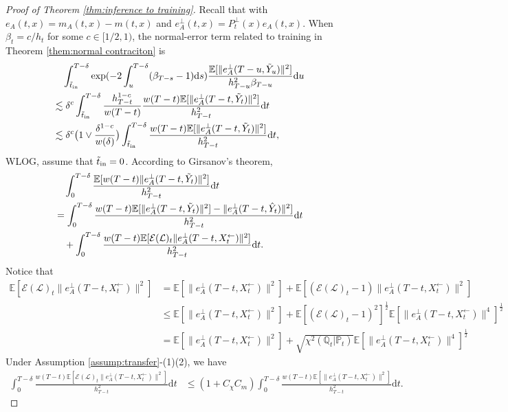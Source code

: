 \documentclass[11pt]{article}
\newcommand{\mb}{\mathbb}
\newcommand{\dee}{\mathrm{d}}
\newcommand{\mc}{\mathcal}
\begin{document}
\begin{proof}[Proof of Theorem \ref{thm:inference to training}]
\noindent Recall that with $e_A(t,x)=m_A(t,x)-m(t,x)$ and $e_A^\perp(t,x)=P^\perp_t(x) e_A(t,x)$. When $\beta_t=c/h_t$ for some $c\in [1/2,1)$, the normal-error term related to training in Theorem \ref{them:normal contraciton} is
\begin{align*}
&\quad\int_{\Tilde{t}_{\mathrm{in}}}^{T-\delta} \exp(-2\int_u^{T-\delta} (\beta_{T-s}-1)\dee s ) \frac{\mb{E}[\| e_A^\perp(T-u,\Tilde{Y}_u)\|^2]}{h_{T-u}^2\beta_{T-u}} \dee u \\
&\lesssim \delta^c \int_{\Tilde{t}_{\mathrm{in}}}^{T-\delta} \frac{h_{T-t}^{1-c}}{w(T-t)} \frac{w(T-t)\mb{E}[\| e_A^\perp(T-t,\Tilde{Y}_t)\|^2]}{h_{T-t}^2} \dee t\\
&\lesssim \delta^c  \big(1 \vee \frac{\delta^{1-c}}{w(\delta)}\big) \int_{\Tilde{t}_{\mathrm{in}}}^{T-\delta} \frac{w(T-t)\mb{E}[\| e_A^\perp(T-t,\Tilde{Y}_t)\|^2]}{h_{T-t}^2} \dee t,
\end{align*}
WLOG, assume that $\Tilde{t}_{\mathrm{in}}=0$. According to Girsanov's theorem,
\begin{align*}
    &\quad \int_0^{T-\delta} \frac{\mb{E}[w(T-t)\| e_A^\perp(T-t,\Tilde{Y}_t)\|^2]}{h_{T-t}^2} \dee t \\
    & = \int_0^{T-\delta} \frac{w(T-t)\mb{E}[\| e_A^\perp(T-t,\Tilde{Y}_t)\|^2]-\| e_A^\perp(T-t,\hat{Y}_t)\|^2] }{h_{T-t}^2} \dee t  \\
    &\quad + \int_0^{T-\delta} \frac{w(T-t)\mb{E}[\mc{E}(\mc{L})_t\| e_A^\perp(T-t,X_t^\leftarrow)\|^2]}{h_{T-t}^2}\dee t .
\end{align*}
Notice that
\begin{align*}
    \mb{E}[\mc{E}(\mc{L})_t\| e_A^\perp(T-t,X_t^\leftarrow)\|^2] & = \mb{E}[\| e_A^\perp(T-t,X_t^\leftarrow)\|^2] + \mb{E}[(\mc{E}(\mc{L})_t-1)\| e_A^\perp(T-t,X_t^\leftarrow)\|^2] \\
    & \le \mb{E}[\| e_A^\perp(T-t,X_t^\leftarrow)\|^2] + \mb{E}[(\mc{E}(\mc{L})_t-1)^2]^{\frac{1}{2}}  \mb{E}[\| e_A^\perp(T-t,X_t^\leftarrow)\|^4]^{\frac{1}{2}} \\
    & = \mb{E}[\| e_A^\perp(T-t,X_t^\leftarrow)\|^2] + \sqrt{\chi^2(\mb{Q}_t|\mb{P}_t)}  \mb{E}[\| e_A^\perp(T-t,X_t^\leftarrow)\|^4]^{\frac{1}{2}}
\end{align*}
Under Assumption \ref{assump:transfer}-(1)(2), we have
\begin{align*}
    \int_0^{T-\delta} \frac{w(T-t)\mb{E}[\mc{E}(\mc{L})_t\| e_A^\perp(T-t,X_t^\leftarrow)\|^2]}{h_{T-t}^2}\dee t &\le (1+C_\chi C_m)\int_0^{T-\delta} \frac{w(T-t)\mb{E}[\| e_A^\perp(T-t,X_t^\leftarrow)\|^2]}{h_{T-t}^2}\dee t .

\end{align*}
\end{proof}
\end{document}
